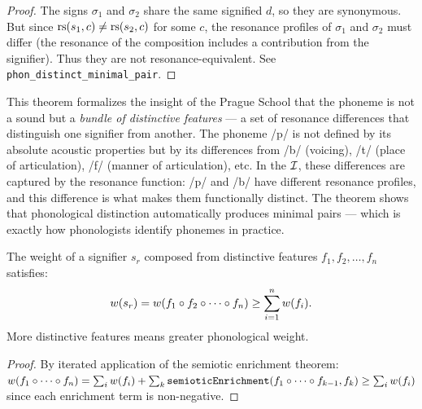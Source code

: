 \begin{proof}
The signs $\sigma_1$ and $\sigma_2$ share the same signified $d$, so
they are synonymous. But since $\mathrm{rs}(s_1, c) \neq \mathrm{rs}(s_2, c)$ for
some $c$, the resonance profiles of $\sigma_1$ and $\sigma_2$ must
differ (the resonance of the composition includes a contribution from
the signifier). Thus they are not resonance-equivalent. See
\texttt{phon\_distinct\_minimal\_pair}.
\end{proof}

\begin{interpretation}
This theorem formalizes the insight of the Prague School that the
phoneme is not a sound but a \emph{bundle of distinctive features}
--- a set of resonance differences that distinguish one signifier
from another. The phoneme /p/ is not defined by its absolute acoustic
properties but by its differences from /b/ (voicing), /t/ (place of
articulation), /f/ (manner of articulation), etc. In the $\mathcal{I}$, these
differences are captured by the resonance function: /p/ and /b/ have
different resonance profiles, and this difference is what makes them
functionally distinct. The theorem shows that phonological distinction
automatically produces minimal pairs --- which is exactly how
phonologists identify phonemes in practice.
\end{interpretation}

\begin{theorem}
\label{thm:phon-weight}
The weight of a signifier $s_r$ composed from distinctive features $f_1, f_2, \ldots, f_n$ satisfies:
\[
  w(s_r) = w(f_1 \circ f_2 \circ \cdots \circ f_n) \geq \sum_{i=1}^{n} w(f_i).
\]
More distinctive features means greater phonological weight.
\end{theorem}

\begin{proof}
By iterated application of the semiotic enrichment theorem: $w(f_1 \circ \cdots \circ f_n) = \sum_i w(f_i) + \sum_k \texttt{semioticEnrichment}(f_1 \circ \cdots \circ f_{k-1}, f_k) \geq \sum_i w(f_i)$ since each enrichment term is non-negative.
\end{proof}

